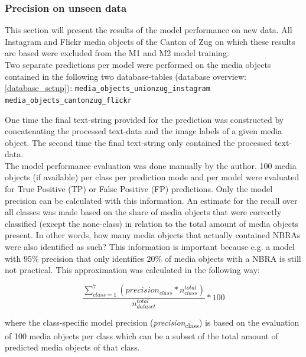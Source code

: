 \subsubsection{Precision on unseen data}
This section will present the results of the model performance on new data. All Instagram and Flickr media objects of the Canton of Zug on which these results are based were excluded from the M1 and M2 model training.\\
Two separate predictions per model were performed on the media objects contained in the following two database-tables (database overview: \ref{database_setup}):
\texttt{media\_objects\_unionzug\_instagram} \\ \texttt{media\_objects\_cantonzug\_flickr}

One time the final text-string provided for the prediction was constructed by concatenating the processed text-data and the image labels of a given media object. The second time the final text-string only contained the processed text-data.\\

The model performance evaluation was done manually by the author. 100 media objects (if available) per class per prediction mode and per model were evaluated for True Positive (TP) or False Positive (FP) predictions. Only the model precision can be calculated with this information. An estimate for the recall over all classes was made based on the share of media objects that were correctly classified (except the none-class) in relation to the total amount of media objects present. In other words, how many media objects that actually contained NBRAs were also identified as such? This information is important because e.g. a model with 95\% precision that only identifies 20\% of media objects with a NBRA is still not practical. This approximation was calculated in the following way:

\begin{equation}
\label{equation_share_TP}
\frac{\sum_{class=1}^{7}(precision_{class}  * n^{total}_{class})}{n^{total}_{dataset}} * 100
\end{equation}
   
where the class-specific model precision (\textit{precision}\textsubscript{class}) is based on the evaluation of 100 media objects per class which can be a subset of the total amount of predicted media objects of that class.

